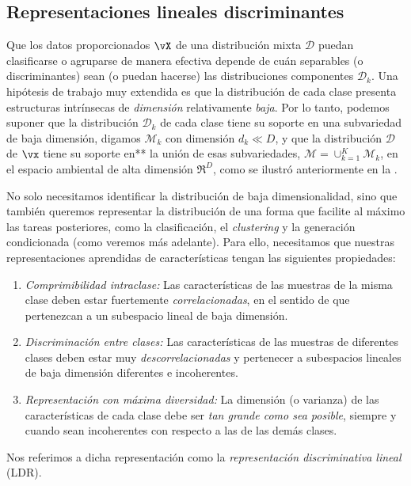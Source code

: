 \documentclass[../../book-main.tex]{subfiles}
\begin{document}
\subsection{Representaciones lineales discriminantes}\label{subsec:LDR}

Que los datos proporcionados $\vX$ de una distribución mixta $\mathcal{D}$ puedan
clasificarse o agruparse de manera efectiva depende de cuán separables (o
discriminantes) sean (o puedan hacerse) las distribuciones componentes $\mathcal{D}_k$.
Una hipótesis de trabajo muy extendida es que la distribución
de cada clase presenta estructuras intrínsecas
de {\em dimensión} relativamente {\em baja}. Por lo tanto, podemos suponer que la distribución $\mathcal{D}_k$
de cada clase tiene su soporte en una subvariedad de baja dimensión, digamos
$\mathcal{M}_k$ con dimensión $d_k \ll D$, y que la distribución
$\mathcal D$ de $\vx$ tiene su soporte en** la unión de esas 
subvariedades, $\mathcal M = \cup_{k=1}^K \mathcal{M}_k$,  en el
espacio ambiental de alta dimensión $\Re^D$, como se ilustró anteriormente en la
.

No solo necesitamos identificar la distribución de baja dimensionalidad, sino que
también queremos representar la distribución de una forma que
facilite al máximo las tareas posteriores, como la clasificación, el \textit{clustering} y
la generación condicionada (como veremos más adelante). Para ello,
necesitamos que nuestras representaciones aprendidas de características tengan las siguientes
propiedades:
\begin{enumerate}
    \item {\em Comprimibilidad intraclase:} Las características de las muestras de la
        misma clase deben estar fuertemente {\em correlacionadas}, en el sentido de que
        pertenezcan a un subespacio lineal de baja dimensión.
    \item {\em Discriminación entre clases:} Las características de las muestras de
        diferentes clases deben estar muy {\em descorrelacionadas} y pertenecer
        a subespacios lineales de baja dimensión diferentes e incoherentes.
    \item {\em Representación con máxima diversidad:} La dimensión (o varianza)
        de las características de cada clase debe ser {\em tan grande como sea
        posible}, siempre y cuando sean incoherentes con respecto a las de las demás clases.
\end{enumerate}
Nos referimos a dicha representación como la {\em representación discriminativa 
lineal} (LDR).
\end{document}
